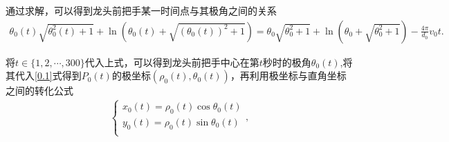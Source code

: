 \documentclass[../main.tex]{subfiles}
\begin{document}
      
      \par 通过求解，可以得到龙头前把手某一时间点与其极角之间的关系
      \begin{align}\label{1.........2}
          \theta _0(t)\sqrt{\theta _{0}^{2}(t)+1}+\ln (\theta _0(t)+\sqrt{(\theta _0(t))^2+1}) =\theta _0\sqrt{\theta _{0}^{2}+1}+\ln (\theta _0+\sqrt{\theta _{0}^{2}+1}) -\frac{4\pi}{d_0}v_0t .
          \end{align}
      \par 将\(t\in \{ 1,2,\cdots ,300 \}\)代入上式，可以得到龙头前把手中心在第\(t\)秒时的极角\(\theta _0(t)\),将其代入\eqref{0.1}式得到\(P_0(t)\)的极坐标\((\rho _0(t),\theta _0(t))\)，再利用极坐标与直角坐标之间的转化公式
          \begin{align}
          \begin{cases}
          x_0(t)=\rho _0(t)\cos \theta _0(t)\\
          y_0(t)=\rho _0(t)\sin \theta _0(t)\\
          \end{cases},\label{1.........3}
          \end{align}
  
\end{document}
